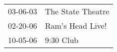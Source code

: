 \begin{supertabular}{p{0.25\columnwidth}p{0.75\columnwidth}}
 03-06-03 &  The State Theatre \\
 02-20-06 &   Ram's Head Live! \\
 10-05-06 &          9:30 Club \\
\end{supertabular}
